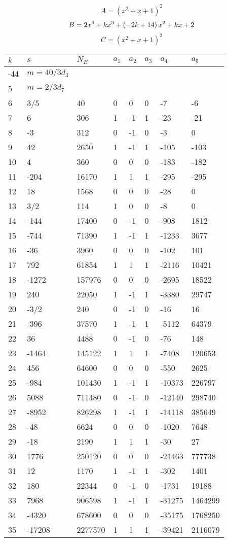 \documentclass{amsart}
\begin{document}
$$A=(x^2
 + x
 + 1)^{2}$$
$$B=2\*x^4
 + k\*x^3
 + \left(-2\*k
 + 14\right) \*x^2
 + k\*x
 + 2$$
$$C=(x^2
 + x
 + 1)^{2}$$
\begin{longtable}{|l|l|l|lllll|}
\hline
$k$ & $s$ & $N_E$ & $a_1$ & $a_2$ & $a_3$ & $a_4$ & $a_5$\\
\hline
-44&$m=40/3d_{3}$&&\multicolumn{5}{c|}{}\\
5&$m=2/3d_{7}$&&\multicolumn{5}{c|}{}\\
6&3/5&40&0&0&0&-7&-6\\
7&6&306&1&-1&1&-23&-21\\
8&-3&312&0&-1&0&-3&0\\
9&42&2650&1&-1&1&-105&-103\\
10&4&360&0&0&0&-183&-182\\
11&-204&16170&1&1&1&-295&-295\\
12&18&1568&0&0&0&-28&0\\
13&3/2&114&1&0&0&-8&0\\
14&-144&17400&0&-1&0&-908&1812\\
15&-744&71390&1&-1&1&-1233&3677\\
16&-36&3960&0&0&0&-102&101\\
17&792&61854&1&1&1&-2116&10421\\
18&-1272&157976&0&0&0&-2695&18522\\
19&240&22050&1&-1&1&-3380&29747\\
20&-3/2&240&0&-1&0&-16&16\\
21&-396&37570&1&-1&1&-5112&64379\\
22&36&4488&0&-1&0&-76&148\\
23&-1464&145122&1&1&1&-7408&120653\\
24&456&64600&0&0&0&-550&2625\\
25&-984&101430&1&-1&1&-10373&226797\\
26&5088&711480&0&-1&0&-12140&298740\\
27&-8952&826298&1&-1&1&-14118&385649\\
28&-48&6624&0&0&0&-1020&7648\\
29&-18&2190&1&1&1&-30&27\\
30&1776&250120&0&0&0&-21463&777738\\
31&12&1170&1&-1&1&-302&1401\\
32&180&22344&0&-1&0&-1731&19188\\
33&7968&906598&1&-1&1&-31275&1464299\\
34&-4320&678600&0&0&0&-35175&1768250\\
35&-17208&2277570&1&1&1&-39421&2116079\\

\end{longtable}
\end{document}
